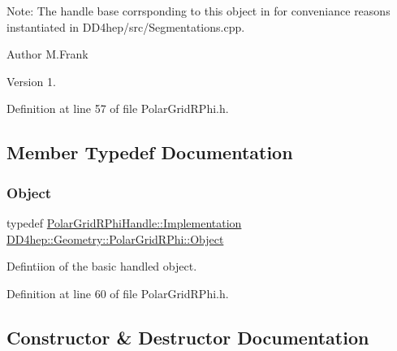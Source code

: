 Note\+: The handle base corrsponding to this object in for conveniance reasons instantiated in D\+D4hep/src/\+Segmentations.\+cpp.

\begin{DoxyAuthor}{Author}
M.\+Frank 
\end{DoxyAuthor}
\begin{DoxyVersion}{Version}
1. 
\end{DoxyVersion}


Definition at line 57 of file Polar\+Grid\+R\+Phi.\+h.



\subsection{Member Typedef Documentation}
\hypertarget{class_d_d4hep_1_1_geometry_1_1_polar_grid_r_phi_aebd15faef8872b8331cb2a153d5665bd}{}\label{class_d_d4hep_1_1_geometry_1_1_polar_grid_r_phi_aebd15faef8872b8331cb2a153d5665bd} 
\subsubsection{\texorpdfstring{Object}{Object}}
{\footnotesize\ttfamily typedef \hyperlink{class_d_d4hep_1_1_handle_ad7ff728a25806079516b8965b9113f1a}{Polar\+Grid\+R\+Phi\+Handle\+::\+Implementation} \hyperlink{class_d_d4hep_1_1_geometry_1_1_polar_grid_r_phi_aebd15faef8872b8331cb2a153d5665bd}{D\+D4hep\+::\+Geometry\+::\+Polar\+Grid\+R\+Phi\+::\+Object}}



Defintiion of the basic handled object. 



Definition at line 60 of file Polar\+Grid\+R\+Phi.\+h.



\subsection{Constructor \& Destructor Documentation}
\hypertarget{class_d_d4hep_1_1_geometry_1_1_polar_grid_r_phi_a8a93298d411aebf8b158a2f9537a600b}{}\label{class_d_d4hep_1_1_geometry_1_1_polar_grid_r_phi_a8a93298d411aebf8b158a2f9537a600b} 
